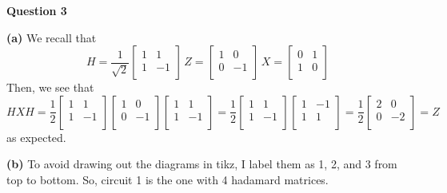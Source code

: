 \documentclass[10pt]{article}
\begin{document}
\newpage
\textbf{Question 3}

\textbf{(a)} We recall that
\[ H = \frac{1}{\sqrt{2}}
\begin{bmatrix}
  1 & 1 \\
  1 & -1 \\
\end{bmatrix}
\,
Z = 
\begin{bmatrix}
  1 & 0 \\
  0 & -1 \\
\end{bmatrix}
\,
X =
\begin{bmatrix}
  0 & 1 \\
  1 & 0 \\
\end{bmatrix}
\]
Then, we see that
\[ HXH = \frac{1}{2}
\begin{bmatrix}
  1 & 1 \\
  1 & -1 \\
\end{bmatrix}
\begin{bmatrix}
  1 & 0 \\
  0 & -1 \\
\end{bmatrix}
\begin{bmatrix}
  1 & 1 \\
  1 & -1 \\
\end{bmatrix}
= \frac{1}{2}
\begin{bmatrix}
  1 & 1 \\
  1 & -1 \\
\end{bmatrix}
\begin{bmatrix}
  1 & -1 \\
  1 & 1 \\
\end{bmatrix}
=
\frac{1}{2}
\begin{bmatrix}
  2 & 0 \\
  0 & -2 \\
\end{bmatrix}
= Z \]
as expected.

\textbf{(b)}
To avoid drawing out the diagrams in tikz, I label them as 1, 2, and 3 from top to bottom. So, circuit 1 is the one with 4 hadamard matrices.
\end{document}
